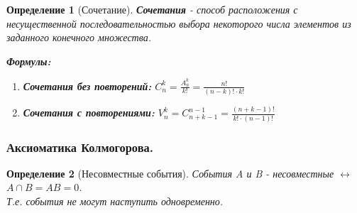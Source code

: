 \documentclass[14pt]{extarticle}
\theoremstyle{breakstyle}
\newtheorem{definition}{Определение}[subsection]
\begin{document}
\begin{definition}[Сочетание]
\textbf{Сочетания} - способ расположения с несущественной последовательностью выбора некоторого числа элементов из заданного конечного множества.

\vspace{1em}

\textbf{Формулы:}
\begin{enumerate}[noitemsep, topsep=0pt]
    \item \textbf{Сочетания без повторений:} $C_{n}^{k} = \frac{A_{n}^{k}}{k!} = \frac{n!}{(n - k)! \cdot k!}$
    \item \textbf{Сочетания с повторениями:} $V_{n}^{k} = C_{n+k-1}^{n-1} = \frac{(n+k-1)!}{k! \cdot (n-1)!}$
\end{enumerate} 

\end{definition}

\subsubsection{Аксиоматика Колмогорова.}
\begin{definition}[Несовместные события]

События A и B - несовместные $\leftrightarrow$ $A \cap B = AB = 0$. \\
Т.е. события не могут наступить одновременно.

\end{definition}
\end{document}
